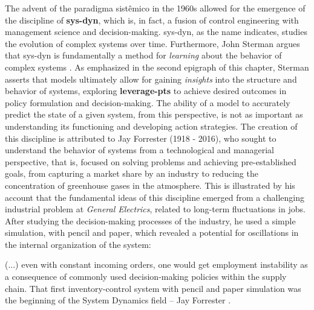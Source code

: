 \documentclass[./main_en.tex]{subfiles}
\begin{document}
\par The advent of the \gls{paradigma} sistêmico in the 1960s allowed for the emergence of the discipline of \textbf{\gls{sys-dyn}}, which is, in fact, a fusion of control engineering with management science and decision-making. \gls{sys-dyn}, as the name indicates, studies the evolution of complex systems over time. Furthermore, John Sterman argues that \gls{sys-dyn} is fundamentally a method for \textit{learning} about the behavior of complex systems \cite{sterman2000}. As emphasized in the second epigraph of this chapter, Sterman asserts that models ultimately allow for gaining \textit{insights} into the structure and behavior of systems, exploring \textbf{\gls{leverage-pts}} to achieve desired outcomes in policy formulation and decision-making. The ability of a \gls{model} to accurately predict the state of a given \gls{system}, from this perspective, is not as important as understanding its functioning and developing action strategies. The creation of this discipline is attributed to Jay Forrester (1918 - 2016), who sought to understand the behavior of systems from a technological and managerial perspective, that is, focused on solving problems and achieving pre-established goals, from capturing a market share by an industry to reducing the concentration of greenhouse gases in the atmosphere. This is illustrated by his account that the fundamental ideas of this discipline emerged from a challenging industrial problem at \textit{General Electrics}, related to long-term fluctuations in jobs. After studying the decision-making processes of the industry, he used a simple simulation, with pencil and paper, which revealed a potential for oscillations in the internal organization of the \gls{system}:

\begin{adjustwidth}{100pt}{0pt}
\medskip
\small (...) even with constant incoming orders, one would get employment instability as a consequence of commonly used decision-making policies within the supply chain. That ﬁrst inventory-control system with pencil and paper simulation was the beginning of the System Dynamics ﬁeld – Jay Forrester \cite{forrester2007}.
\medskip
\end{adjustwidth}
\end{document}

